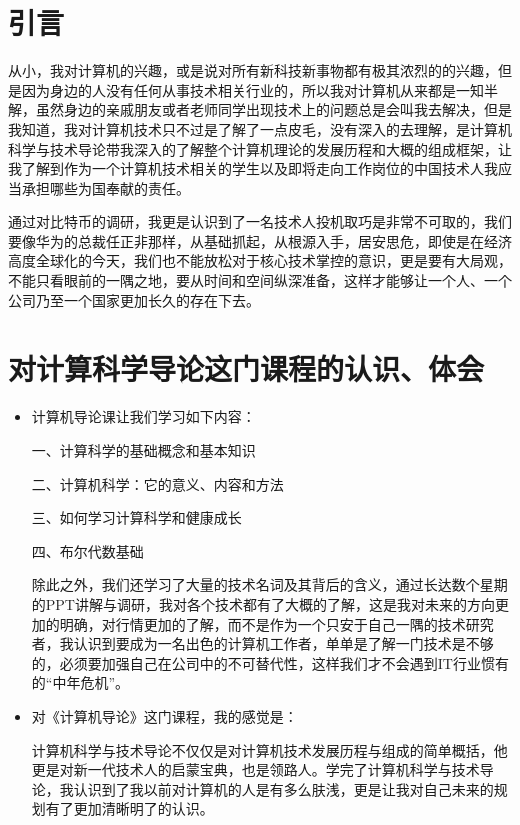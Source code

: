 \documentclass{article}
\begin{document}
\thispagestyle{empty}
\newpage
\setcounter{page}{1}
\section{引言}
	从小，我对计算机的兴趣，或是说对所有新科技新事物都有极其浓烈的的兴趣，但是因为身边的人没有任何从事技术相关行业的，所以我对计算机从来都是一知半解，虽然身边的亲戚朋友或者老师同学出现技术上的问题总是会叫我去解决，但是我知道，我对计算机技术只不过是了解了一点皮毛，没有深入的去理解，是计算机科学与技术导论带我深入的了解整个计算机理论的发展历程和大概的组成框架，让我了解到作为一个计算机技术相关的学生以及即将走向工作岗位的中国技术人我应当承担哪些为国奉献的责任。\par
	通过对比特币的调研，我更是认识到了一名技术人投机取巧是非常不可取的，我们要像华为的总裁任正非那样，从基础抓起，从根源入手，居安思危，即使是在经济高度全球化的今天，我们也不能放松对于核心技术掌控的意识，更是要有大局观，不能只看眼前的一隅之地，要从时间和空间纵深准备，这样才能够让一个人、一个公司乃至一个国家更加长久的存在下去。\par


\section{对计算科学导论这门课程的认识、体会}
\begin{itemize}
    
    \item 计算机导论课让我们学习如下内容：

一、计算科学的基础概念和基本知识

二、计算机科学：它的意义、内容和方法

三、如何学习计算科学和健康成长

四、布尔代数基础

除此之外，我们还学习了大量的技术名词及其背后的含义，通过长达数个星期的PPT讲解与调研，我对各个技术都有了大概的了解，这是我对未来的方向更加的明确，对行情更加的了解，而不是作为一个只安于自己一隅的技术研究者，我认识到要成为一名出色的计算机工作者，单单是了解一门技术是不够的，必须要加强自己在公司中的不可替代性，这样我们才不会遇到IT行业惯有的“中年危机”。\par

    \item 对《计算机导论》这门课程，我的感觉是：\par
	计算机科学与技术导论不仅仅是对计算机技术发展历程与组成的简单概括，他更是对新一代技术人的启蒙宝典，也是领路人。学完了计算机科学与技术导论，我认识到了我以前对计算机的人是有多么肤浅，更是让我对自己未来的规划有了更加清晰明了的认识。\par

\end{itemize}
\par
\end{document}
